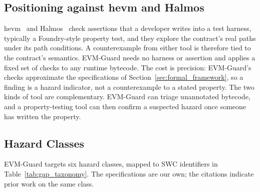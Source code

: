 \documentclass[pdflatex,sn-mathphys]{sn-jnl}
\theoremstyle{thmstyleone}
\theoremstyle{thmstyletwo}
\begin{document}
\subsection{Positioning against hevm and Halmos}\label{sec:gaps:hevm}
hevm~\cite{dxo2024hevm} and Halmos~\cite{a16z2023halmos} check assertions that a developer writes into a test harness, typically a Foundry-style property test, and they explore the contract's real paths under its path conditions. A counterexample from either tool is therefore tied to the contract's semantics. EVM-Guard needs no harness or assertion and applies a fixed set of checks to any runtime bytecode. The cost is precision: EVM-Guard's checks approximate the specifications of Section~\ref{sec:formal_framework}, so a finding is a hazard indicator, not a counterexample to a stated property. The two kinds of tool are complementary. EVM-Guard can triage unannotated bytecode, and a property-testing tool can then confirm a suspected hazard once someone has written the property.

\subsection{Hazard Classes}\label{sec:gaps:taxonomy}
EVM-Guard targets six hazard classes, mapped to SWC identifiers in Table~\ref{tab:gap_taxonomy}. The specifications are our own; the citations indicate prior work on the same class.

\begin{table}[t]
\centering
\small
\caption{Hazard classes targeted by EVM-Guard and the corresponding specification (Section~\ref{sec:math:invariants}).}
\label{tab:gap_taxonomy}
\end{table}
\end{document}
